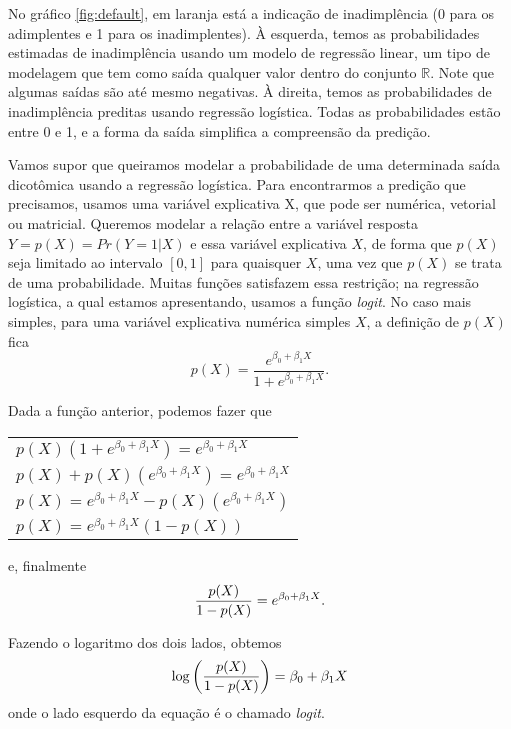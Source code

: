 \documentclass[
	12pt,				%
	openright,			%
	twoside,			%
	a4paper,			%
	english,			%
	brazil				%
	]{abntex2}
\begin{document}
 No gráfico \ref{fig:default}, em laranja está a indicação de inadimplência (0 para os adimplentes e 1 para os inadimplentes). À esquerda, temos as probabilidades estimadas de inadimplência usando um modelo de regressão linear, um tipo de modelagem que tem como saída qualquer valor dentro do conjunto $\mathbb{R}$. Note que algumas saídas são até mesmo negativas. À direita, temos as probabilidades de inadimplência preditas usando regressão logística. Todas as probabilidades estão entre 0 e 1, e a forma da saída simplifica a compreensão da predição.

 Vamos supor que queiramos modelar a probabilidade de uma determinada saída dicotômica usando a regressão logística. Para encontrarmos a predição que precisamos, usamos uma variável explicativa X, que pode ser numérica, vetorial ou matricial. Queremos modelar a relação entre a variável resposta $Y = p(X) = Pr(Y=1|X)$ e essa variável explicativa $X$, de forma que $p(X)$ seja limitado ao intervalo $[0, 1]$ para quaisquer $X$, uma vez que $p(X)$ se trata de uma probabilidade. Muitas funções satisfazem essa restrição; na regressão logística, a qual estamos apresentando, usamos a função \emph{logit}. No caso mais simples, para uma variável explicativa numérica simples $X$, a definição de $p(X)$ fica
 \begin{equation}
    p(X) = \frac{e^{\beta_{0} + \beta_{1} X}}{1 + e^{\beta_{0} + \beta_{1} X}}\label{eq:defpx}.
 \end{equation}

 Dada a função anterior, podemos fazer que
 \begin{center}
    \begin{tabular}{l}
        $p(X) (1 + e^{\beta_{0} + \beta_{1} X}) = e^{\beta_{0} + \beta_{1} X}$ \\
        $p(X) + p(X) (e^{\beta_{0} + \beta_{1} X}) = e^{\beta_{0} + \beta_{1} X}$ \\
        $p(X) = e^{\beta_{0} + \beta_{1} X} - p(X) (e^{\beta_{0} + \beta_{1} X})$ \\
        $p(X) = e^{\beta_{0} + \beta_{1} X} (1 - p(X))$ \\
    \end{tabular}
 \end{center}
 e, finalmente
 \begin{equation}
     \frac{p(X)}{1-p(X)} = e^{\beta_{0} + \beta_{1} X}\label{eq:prelogit}. \\
 \end{equation}
 
 Fazendo o logaritmo dos dois lados, obtemos
 \begin{equation}
     \log\bigg(\frac{p(X)}{1-p(X)}\bigg) = \beta_{0} + \beta_{1} X\label{eq:logit} \\
 \end{equation}
 onde o lado esquerdo da equação é o chamado \emph{logit}.
 
\end{document}
